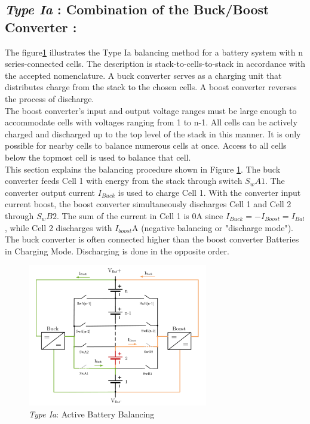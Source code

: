\subsection{\textit{Type Ia} : Combination of the Buck/Boost Converter :}
The figure\ref{fig:Type 1a Active Battery Balancing} illustrates the Type Ia balancing method for a battery system with n series-connected cells. The description is stack-to-cells-to-stack in accordance with the accepted nomenclature. A buck converter serves as a charging unit that distributes charge from the stack to the chosen cells. A boost converter reverses the process of discharge.
\\
The boost converter's input and output voltage ranges must be large enough to accommodate cells with voltages ranging from 1 to n-1. All cells can be actively charged and discharged up to the top level of the stack in this manner. It is only possible for nearby cells to balance numerous cells at once. Access to all cells below the topmost cell is used to balance that cell.
\\
This section explains the balancing procedure shown in Figure \ref{fig:Type 1a Active Battery Balancing}. The buck converter feeds Cell 1 with energy from the stack through switch \textit{$S_wA1$}. The converter output current $I_{Buck}$ is used to charge Cell 1. With the converter input current boost, the boost converter simultaneously discharges Cell 1 and Cell 2 through \textit{$S_wB2$}. The sum of the current in Cell 1 is 0A since $I_{Buck} = -I_{Boost} = I_{Bal}$, while Cell 2 discharges with $I_{boost}$A (negative balancing or "discharge mode"). The buck converter is often connected higher than the boost converter Batteries in Charging Mode. Discharging is done in the opposite order.
\\

\begin{figure}[h]
	\centering
	\includegraphics[width=0.7\textwidth]{Chap04/Figures/Type1a_ABMS.PNG}
	\caption{\textit{Type Ia}: Active Battery Balancing} 
	\label{fig:Type 1a Active Battery Balancing}
\end{figure}

